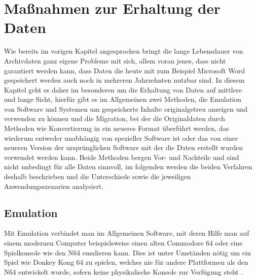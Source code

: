 \documentclass[conference,compsoc,final,a4paper]{IEEEtran}
\begin{document}
\section{Maßnahmen zur Erhaltung der Daten}
Wie bereits im vorigen Kapitel angesprochen bringt die lange Lebensdauer von Archivdaten ganz eigene Probleme mit sich, allem voran jenes, dass nicht garantiert werden kann, dass Daten die heute mit zum Beispiel Microsoft Word gespeichert werden auch noch in mehreren Jahrzehnten nutzbar sind. In diesem Kapitel geht es daher im besonderen um die Erhaltung von Daten auf mittlere und lange Sicht, hierfür gibt es im Allgemeinen zwei Methoden, die Emulation von Software und Systemen um gespeicherte Inhalte originalgetreu anzeigen und verwenden zu können und die Migration, bei der die Originaldaten durch Methoden wie Konvertierung in ein neueres Format überführt werden, das wiederum entweder unabhängig von spezieller Software ist oder das von einer neueren Version der ursprünglichen Software mit der die Daten erstellt wurden verwendet werden kann. Beide Methoden bergen Vor- und Nachteile und sind nicht unbedingt für alle Daten sinnvoll, im folgenden werden die beiden Verfahren deshalb beschrieben und die Unterschiede sowie die jeweiligen Anwendungsszenarien analysiert.

\subsection{Emulation}
Mit Emulation verbindet man im Allgemeinen Software, mit deren Hilfe man auf einem modernen Computer beispielsweise einen alten Commodore 64 oder eine Spielkonsole wie den N64 emulieren kann. Dies ist unter Umständen nötig um ein Spiel wie Donkey Kong 64 zu spielen, welches nie für andere Plattformen als den N64 entwickelt wurde, sofern keine physikalische Konsole zur Verfügung steht \autocite{ViceEmu,Project64}.
\end{document}
